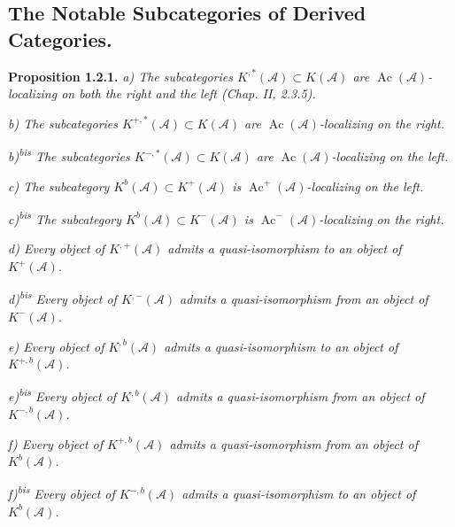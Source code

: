\clearpage
{}%
\begingroup\small\setlength{\parskip}{0pt}\setlength{\emergencystretch}{1.5em}
\setlength{\abovedisplayskip}{4pt plus 2pt minus 2pt}%
\setlength{\belowdisplayskip}{4pt plus 2pt minus 2pt}%

\subsection{The Notable Subcategories of Derived Categories.}

\noindent\textbf{Proposition 1.2.1.}\quad
\textit{a) The subcategories
$K^{,*}(\mathcal A)\subset K(\mathcal A)$ are
$\operatorname{Ac}(\mathcal A)$-localizing on both the right and the left
(Chap. II, 2.3.5).}

\noindent\textit{b) The subcategories
$K^{+,*}(\mathcal A)\subset K(\mathcal A)$ are
$\operatorname{Ac}(\mathcal A)$-localizing on the right.}

\noindent\textit{b)\textsuperscript{bis} The subcategories
$K^{-,*}(\mathcal A)\subset K(\mathcal A)$ are
$\operatorname{Ac}(\mathcal A)$-localizing on the left.}

\noindent\textit{c) The subcategory
$K^{b}(\mathcal A)\subset K^{+}(\mathcal A)$ is
$\operatorname{Ac}^{+}(\mathcal A)$-localizing on the left.}

\noindent\textit{c)\textsuperscript{bis} The subcategory
$K^{b}(\mathcal A)\subset K^{-}(\mathcal A)$ is
$\operatorname{Ac}^{-}(\mathcal A)$-localizing on the right.}

\noindent\textit{d) Every object of $K^{,+}(\mathcal A)$ admits a
quasi-isomorphism to an object of $K^{+}(\mathcal A)$.}

\noindent\textit{d)\textsuperscript{bis} Every object of
$K^{,-}(\mathcal A)$ admits a quasi-isomorphism from an object of
$K^{-}(\mathcal A)$.}

\noindent\textit{e) Every object of $K^{,b}(\mathcal A)$ admits a
quasi-isomorphism to an object of $K^{+,b}(\mathcal A)$.}

\noindent\textit{e)\textsuperscript{bis} Every object of
$K^{,b}(\mathcal A)$ admits a quasi-isomorphism from an object of
$K^{-,b}(\mathcal A)$.}

\noindent\textit{f) Every object of $K^{+,b}(\mathcal A)$ admits a
quasi-isomorphism from an object of $K^{b}(\mathcal A)$.}

\noindent\textit{f)\textsuperscript{bis} Every object of
$K^{-,b}(\mathcal A)$ admits a quasi-isomorphism to an object of
$K^{b}(\mathcal A)$.}

